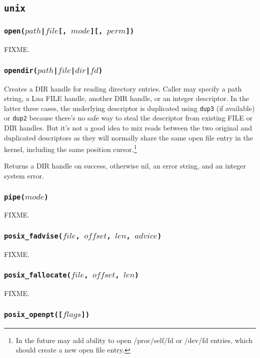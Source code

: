 \documentclass[11pt, oneside]{memoir}
\newcommand*{\syscall}[1]{\texttt{#1}\xspace}
\newcommand*{\fn}[1]{\texttt{#1}\xspace}
\newcounter{toccols}
\newenvironment{Module}[1]{
	\subsection{\texttt{#1}}
	\addtocontents{toc}{
		\protect\begin{multicols}{\value{toccols}}
	}
}{
	\addtocontents{toc}{\protect\end{multicols}}
}
\begin{document}
\begin{Module}{unix}
\subsubsection[\fn{open}]{\fn{open($path$|$file$[, $mode$][, $perm$])}}

FIXME.

\subsubsection[\fn{opendir}]{\fn{opendir($path$|$file$|$dir$|$fd$)}}

Creates a DIR handle for reading directory entries. Caller may specify a path string, a Lua FILE handle, another DIR handle, or an integer descriptor. In the latter three cases, the underlying descriptor is duplicated using \syscall{dup3} (if available) or \syscall{dup2} because there's no safe way to steal the descriptor from existing FILE or DIR handles. But it's not a good idea to mix reads between the two original and duplicated descriptors as they will normally share the same open file entry in the kernel, including the same position cursor.\footnote{In the future may add ability to open /proc/self/fd or /dev/fd entries, which should create a new open file entry.}

Returns a DIR handle on success, otherwise nil, an error string, and an integer system error.

\subsubsection[\fn{pipe}]{\fn{pipe($mode$)}}

FIXME.

\subsubsection[\fn{posix\_fadvise}]{\fn{posix\_fadvise($file$, $offset$, $len$, $advice$)}}

FIXME.

\subsubsection[\fn{posix\_fallocate}]{\fn{posix\_fallocate($file$, $offset$, $len$)}}

FIXME.

\subsubsection[\fn{posix\_openpt}]{\fn{posix\_openpt([$flags$])}}


\end{Module}
\end{document}
